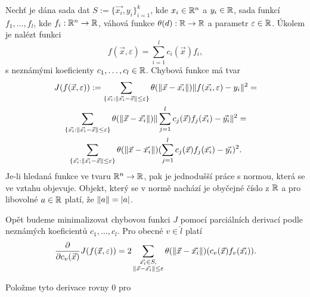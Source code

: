 Nechť je dána sada dat $S := \{\vec{x_i}, y_i\}_{i = 1}^k$, kde $x_i \in \mathbb{R}^n$ a $y_i \in \mathbb{R}$, sada funkcí $f_1,\ldots,f_l$, kde $f_i: \mathbb{R}^n \rightarrow \mathbb{R}$, váhová funkce $\theta(d): \mathbb{R} \rightarrow \mathbb{R}$ a parametr $\varepsilon \in \mathbb{R}$. Úkolem je nalézt funkci
\begin{equation}
  \label{defi:mwls-1d}
  f(\vec{x},\varepsilon) = \sum_{i=1}^lc_i(\vec{x})f_i,
\end{equation}
s neznámými koeficienty $c_1, \ldots, c_l \in \mathbb{R}$. Chybová funkce má tvar
\begin{multline}
  \label{defi:mwls-min-1d}
  J(f(\vec{x},\varepsilon)) :=
  \sum_{\{\vec{x_i} : \|\vec{x_i} - \vec{x}\| \leq \varepsilon\}} \theta(\|\vec{x} - \vec{x_i}\|)\|f(\vec{x_i}, \varepsilon) - y_i\|^2 =\\
  \sum_{\{\vec{x_i} : \|\vec{x_i} - \vec{x}\| \leq \varepsilon\}} \theta(\|\vec{x} - \vec{x_i}\|)\|\sum_{j=1}^l c_j(\vec{x})f_j(\vec{x_i}) - \vec{y_i}\|^2 =\\
  \sum_{\{\vec{x_i} : \|\vec{x_i} - \vec{x}\| \leq \varepsilon\}} \theta(\|\vec{x} - \vec{x_i}\|)(\sum_{j=1}^l c_j(\vec{x})f_j(\vec{x_i}) - \vec{y_i})^2.\\
\end{multline}
Je-li hledaná funkce ve tvaru $\mathbb{R}^n \rightarrow \mathbb{R}$, pak je jednodušší práce s normou, která se ve vztahu objevuje. Objekt, který se v normě nachází je obyčejné číslo z $\mathbb{R}$ a pro libovolné $a \in \mathbb{R}$ platí, že $\|a\| = |a|$.

Opět budeme minimalizovat chybovou funkci $J$ pomocí parciálních derivací podle neznámých koeficientů $c_1, \ldots, c_l$. Pro obecné $v \in \hat l$ platí
\begin{equation}
  \label{eq:1d-mwls-diff}
  \frac{\partial}{\partial c_v(\vec{x})}J(f(\vec{x}, \varepsilon)) =
  2\sum_{\substack{\vec{x_i} \in S,\\\|\vec{x} - \vec{x_i}\| \leq \varepsilon}} \theta(\|\vec{x} - \vec{x_i}\|)(c_v(\vec{x})f_v(\vec{x_i})).
\end{equation}

Položme tyto derivace rovny $0$ pro

